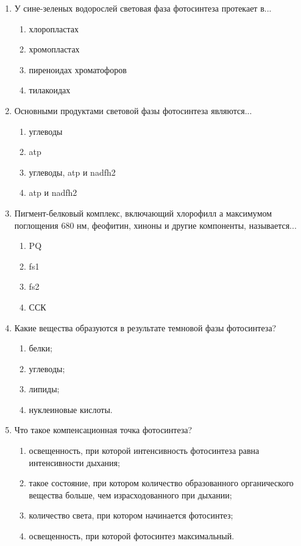 \begin{enumerate}
\item У сине-зеленых водорослей световая фаза фотосинтеза
протекает в...
\begin{enumerate}
	\item хлоропластах                                
	\item хромопластах
	\item пиреноидах хроматофоров          
	\item тилакоидах
\end{enumerate}

\item Основными продуктами световой фазы фотосинтеза являются...
\begin{enumerate}
	\item углеводы                                                      
	\item \gls{atp}
	\item углеводы, \gls{atp} и \gls{nadfh2}                      
	\item \gls{atp} и \gls{nadfh2}
\end{enumerate}

\item Пигмент-белковый комплекс, включающий хлорофилл а максимумом поглощения 680 нм, феофитин, хиноны и другие компоненты, называется...
\begin{enumerate}
	\item PQ                 
	\item \gls{fs1}
	\item \gls{fs2}            
	\item ССК
\end{enumerate}

\item Какие вещества образуются в результате темновой фазы фотосинтеза?
\begin{enumerate}
	\item белки; 
	\item углеводы; 
	\item липиды; 
	\item нуклеиновые кислоты.
\end{enumerate}

\item Что такое компенсационная точка фотосинтеза?
\begin{enumerate}
	\item освещенность, при которой интенсивность фотосинтеза равна интенсивности  дыхания; 
	\item такое состояние, при котором количество образованного органического вещества больше, чем израсходованного при дыхании; 
	\item количество света, при котором начинается фотосинтез; 
	\item освещенность, при которой фотосинтез максимальный.
\end{enumerate}


\end{enumerate}
